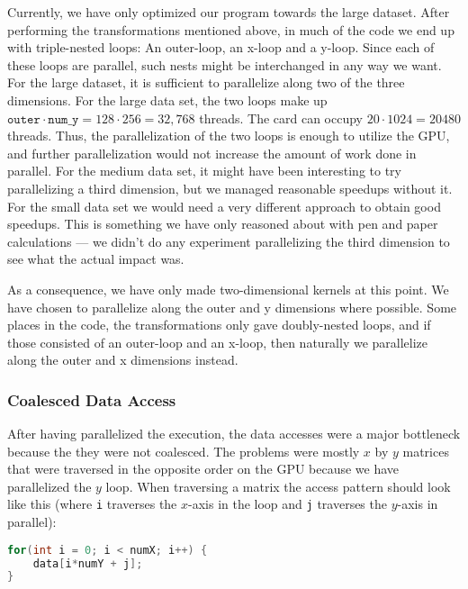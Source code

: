 \documentclass[11pt]{article}
\begin{document}
Currently, we have only optimized our program towards the large dataset.
After performing the transformations mentioned above, in much of the code we end up with triple-nested loops: An outer-loop, an x-loop and a y-loop. Since each of these loops are parallel, such nests might be interchanged in any way we want. For the large dataset, it is sufficient to parallelize along two of the three dimensions.
For the large data set, the two loops make up $\mathtt{outer} \cdot \mathtt{num\_y} = 128 \cdot 256 = 32,768$ threads.
The card can occupy $20 \cdot 1024 = 20480$ threads.
Thus, the parallelization of the two loops is enough to utilize the GPU, and further parallelization would not increase the amount of work done in parallel.
For the medium data set, it might have been interesting to try parallelizing a third dimension, but we managed reasonable speedups without it.
For the small data set we would need a very different approach to obtain good speedups.
This is something we have only reasoned about with pen and paper calculations --- we didn't do any experiment parallelizing the third dimension to see what the actual impact was.

As a consequence, we have only made two-dimensional kernels at this point. We have chosen to parallelize along the outer and y dimensions where possible. Some places in the code, the transformations only gave doubly-nested loops, and if those consisted of an outer-loop and an x-loop, then naturally we parallelize along the outer and x dimensions instead.


\subsubsection{Coalesced Data Access}
After having parallelized the execution, the data accesses were a major bottleneck because the they were not coalesced.
The problems were mostly $x$ by $y$ matrices that were traversed in the opposite order on the GPU because we have parallelized the $y$ loop.
When traversing a matrix the access pattern should look like this (where \texttt{i} traverses the $x$-axis in the loop and \texttt{j} traverses the $y$-axis in parallel):
\begin{lstlisting}[language=C]
for(int i = 0; i < numX; i++) {
	data[i*numY + j];
}
\end{lstlisting}
\end{document}
